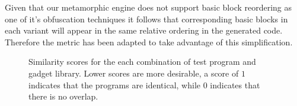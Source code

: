     Given that our metamorphic engine does not support basic block
    reordering as one of it's obfuscation techniques it follows that
    corresponding basic blocks in each variant will appear in the same
    relative ordering in the generated code. Therefore the metric has been
    adapted to take advantage of this simplification.

    \begin{figure}[t]
        \vspace{-50pt}
        \caption[Graph of variation between generated programs]
        {Similarity scores for the each combination of test program
        and gadget library. Lower scores are more desirable, a score of $1$
        indicates that the programs are identical, while $0$ indicates that
        there is no overlap.}
        \label{tab:results-different}
    \end{figure}
